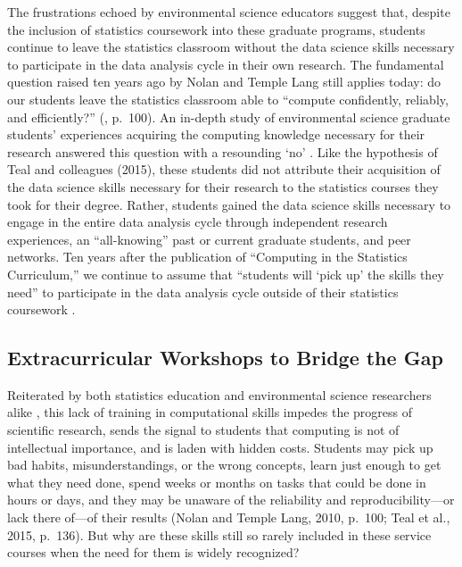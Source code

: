 \documentclass[12pt]{article}
\begin{document}
\quad The frustrations echoed by environmental science educators 
\citep{hampton, datacarpentry} suggest that, despite the inclusion of statistics 
coursework into these graduate programs, students continue to leave the 
statistics classroom without the data science skills necessary to participate in 
the data analysis cycle in their own research. The fundamental question raised 
ten years ago by Nolan and Temple Lang still applies today: do our students
leave the statistics classroom able to ``compute confidently, reliably, and
efficiently?'' (\citeyear{nolan}, p.\ 100). An in-depth study of environmental 
science graduate students' experiences acquiring the computing knowledge
necessary for their research answered this question with a resounding `no' 
\citep{theobold}. Like the hypothesis of Teal and colleagues (2015), these
students did not attribute their acquisition of the data science skills
necessary for their research to the statistics courses they took for their
degree. Rather, students gained the data science skills necessary to engage in
the entire data analysis cycle through independent research experiences, an
``all-knowing'' past or current graduate students, and peer networks. Ten years 
after the publication of ``Computing in the Statistics Curriculum,'' we continue
to assume that ``students will `pick up' the skills they need'' to participate 
in the data analysis cycle outside of their statistics coursework 
\citep[p.\ 309]{gould}. 

\subsection{Extracurricular Workshops to Bridge the Gap}

\quad Reiterated by both statistics education and environmental science 
researchers alike \citep{nolan, datacarpentry}, this lack of training in 
computational skills impedes the progress of scientific research, sends the 
signal to students that computing is not of intellectual importance, and is 
laden with hidden costs. Students may pick up bad habits, misunderstandings, or 
the wrong concepts, learn just enough to get what they need done, spend weeks or
months on tasks that could be done in hours or days, and they may be unaware of 
the reliability and reproducibility---or lack there of---of their results (Nolan
and Temple Lang, 2010, p.\ 100; Teal et al., 2015, p.\ 136). But why are these
skills still so rarely included in these service courses when the need for them
is widely recognized?
\end{document}
